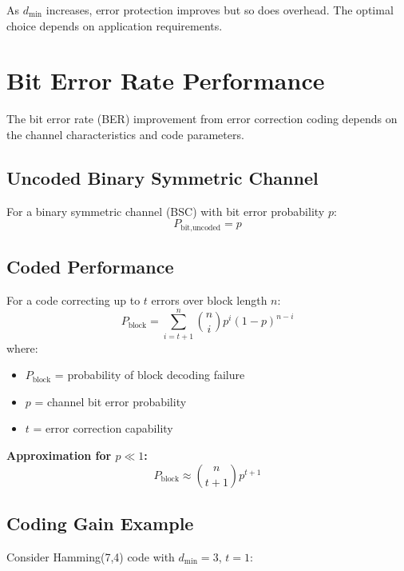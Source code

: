 As $d_{\min}$ increases, error protection improves but so does overhead. The optimal choice depends on application requirements.

\section{Bit Error Rate Performance}

The bit error rate (BER) improvement from error correction coding depends on the channel characteristics and code parameters.

\subsection{Uncoded Binary Symmetric Channel}

For a binary symmetric channel (BSC) with bit error probability $p$:
\begin{equation}
P_{\text{bit,uncoded}} = p
\label{eq:ber-uncoded}
\end{equation}

\subsection{Coded Performance}

For a code correcting up to $t$ errors over block length $n$:
\begin{equation}
P_{\text{block}} = \sum_{i=t+1}^{n} \binom{n}{i} p^i (1-p)^{n-i}
\label{eq:block-error}
\end{equation}
where:
\begin{itemize}
\item $P_{\text{block}}$ = probability of block decoding failure
\item $p$ = channel bit error probability
\item $t$ = error correction capability
\end{itemize}

\textbf{Approximation for $p \ll 1$:}
\begin{equation}
P_{\text{block}} \approx \binom{n}{t+1} p^{t+1}
\label{eq:block-error-approx}
\end{equation}

\subsection{Coding Gain Example}

Consider Hamming(7,4) code with $d_{\min} = 3$, $t = 1$:

